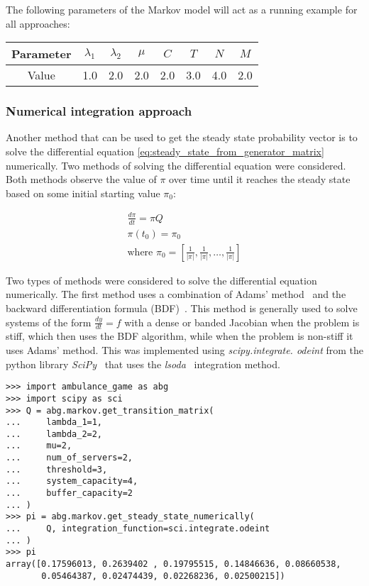 The following parameters of the Markov model will act as a running example for
all approaches:

\begin{center}
    \begin{tabular}{|c|c|c|c|c|c|c|c|}
        \hline
        Parameter & \(\lambda_1\) & \(\lambda_2\) & \(\mu\) & \(C\) & \(T\)
        & \(N\) & \(M\) \\
        \hline
        Value & 1.0 & 2.0 & 2.0 & 2.0 & 3.0 & 4.0 & 2.0 \\
        \hline
    \end{tabular}
\end{center}


\subsubsection{Numerical integration approach}

Another method that can be used to get the steady state probability vector is
to solve the differential equation 
\ref{eq:steady_state_from_generator_matrix} numerically.
Two methods of solving the differential equation were considered.
Both methods observe the value of \(\pi\) over time until it
reaches the steady state based on some initial starting value \(\pi_0\):

\begin{gather}
    \frac{d\pi}{dt} = \pi Q \\
    \pi(t_0) = \pi_0 \nonumber \\
    \text{where } \pi_0 =
    [\frac{1}{|\pi|}, \frac{1}{|\pi|}, \dots, \frac{1}{|\pi|}] \nonumber
\end{gather}

Two types of methods were considered to solve the differential equation
numerically.
The first method uses a combination of Adams' method~\cite{adams_method} and the
backward differentiation formula (BDF)~\cite{backward_differentiation_formula}.
This method is generally used to solve systems of the form
\(\frac{dy}{dt} = f\) with a dense or banded Jacobian when the problem is stiff,
which then uses the BDF algorithm, while when the problem is non-stiff it uses
Adams' method.
This was implemented using \textit{scipy.integrate. odeint} from the python
library \textit{SciPy}~\cite{2020SciPy-NMeth} that uses the
\textit{lsoda}~\cite{lsoda_algorithm} integration method.

\begin{lstlisting}[style=pystyle]
>>> import ambulance_game as abg
>>> import scipy as sci
>>> Q = abg.markov.get_transition_matrix(
...     lambda_1=1,
...     lambda_2=2,
...     mu=2,
...     num_of_servers=2,
...     threshold=3,
...     system_capacity=4,
...     buffer_capacity=2
... )
>>> pi = abg.markov.get_steady_state_numerically(
...     Q, integration_function=sci.integrate.odeint
... )
>>> pi
array([0.17596013, 0.2639402 , 0.19795515, 0.14846636, 0.08660538,
       0.05464387, 0.02474439, 0.02268236, 0.02500215])

\end{lstlisting}



